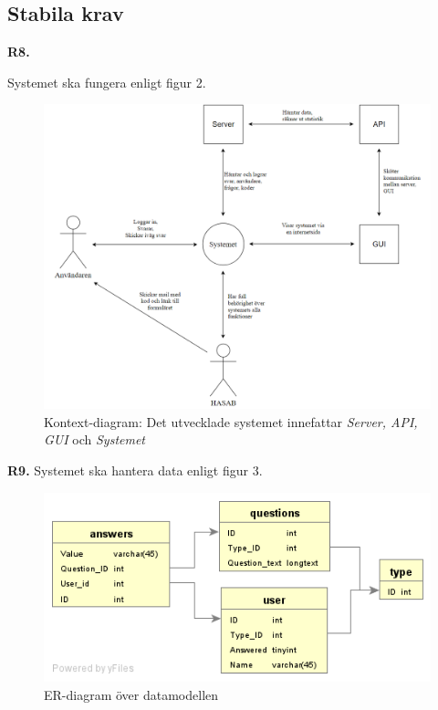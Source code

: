 \documentclass{article}
\begin{document}
    \subsection{Stabila krav}
    \noindent \large{\textbf{R8.}}
    \normalsize{Systemet ska fungera enligt figur 2.
    
    \begin{figure}[h!]
    \caption{Kontext-diagram: Det utvecklade systemet innefattar \textit{Server, API, GUI} och \textit{Systemet}}
    \includegraphics[width=150mm]{Kontextdiagram.png}
    
    \end{figure}
}
    \newpage
    \noindent \large{\textbf{R9.}}
    Systemet ska hantera data enligt figur 3.
       \begin{figure}[h!]
    
    \includegraphics[width=150mm]{er.png}
    \caption{ER-diagram över datamodellen}
    \end{figure}
    
\end{document}
